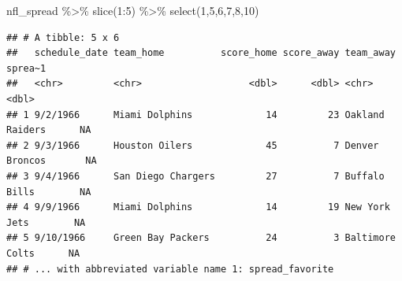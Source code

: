 \documentclass[
  11pt,
]{book}
\newenvironment{Shaded}{\begin{snugshade}}{\end{snugshade}}
\newcommand{\DecValTok}[1]{\textcolor[rgb]{0.00,0.00,0.81}{#1}}
\newcommand{\FunctionTok}[1]{\textcolor[rgb]{0.00,0.00,0.00}{#1}}
\newcommand{\NormalTok}[1]{#1}
\newcommand{\SpecialCharTok}[1]{\textcolor[rgb]{0.00,0.00,0.00}{#1}}
\theoremstyle{definition}
\theoremstyle{definition}
\theoremstyle{definition}
\theoremstyle{definition}
\theoremstyle{remark}
\begin{document}
\begin{Shaded}
\begin{Highlighting}[]
\NormalTok{nfl\_spread }\SpecialCharTok{\%\textgreater{}\%} \FunctionTok{slice}\NormalTok{(}\DecValTok{1}\SpecialCharTok{:}\DecValTok{5}\NormalTok{) }\SpecialCharTok{\%\textgreater{}\%} \FunctionTok{select}\NormalTok{(}\DecValTok{1}\NormalTok{,}\DecValTok{5}\NormalTok{,}\DecValTok{6}\NormalTok{,}\DecValTok{7}\NormalTok{,}\DecValTok{8}\NormalTok{,}\DecValTok{10}\NormalTok{)}
\end{Highlighting}
\end{Shaded}

\begin{verbatim}
## # A tibble: 5 x 6
##   schedule_date team_home          score_home score_away team_away       sprea~1
##   <chr>         <chr>                   <dbl>      <dbl> <chr>             <dbl>
## 1 9/2/1966      Miami Dolphins             14         23 Oakland Raiders      NA
## 2 9/3/1966      Houston Oilers             45          7 Denver Broncos       NA
## 3 9/4/1966      San Diego Chargers         27          7 Buffalo Bills        NA
## 4 9/9/1966      Miami Dolphins             14         19 New York Jets        NA
## 5 9/10/1966     Green Bay Packers          24          3 Baltimore Colts      NA
## # ... with abbreviated variable name 1: spread_favorite
\end{verbatim}

\newpage
\end{document}
